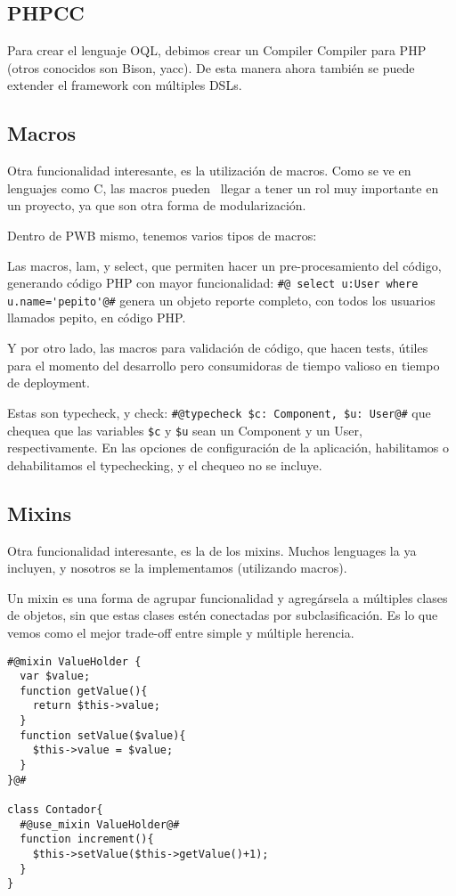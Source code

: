 \subsection{PHPCC}
Para crear el lenguaje OQL, debimos crear un Compiler Compiler para PHP (otros conocidos son Bison, yacc).
De esta manera ahora también se puede extender el framework con múltiples DSLs.

\subsection{Macros}
Otra funcionalidad interesante, es la utilización de macros. Como se ve en lenguajes como C, las macros pueden \
llegar a tener un rol muy importante en un proyecto, ya que son otra forma de modularización.

Dentro de PWB mismo, tenemos varios tipos de macros:

Las macros, lam, y select, que permiten hacer un pre-procesamiento del código, generando código PHP con
mayor funcionalidad:
\verb"#@ select u:User where u.name='pepito'@#"
genera un objeto reporte completo, con todos los usuarios llamados pepito, en código PHP.

Y por otro lado, las macros para validación de código, que hacen tests, útiles para el momento del desarrollo
pero consumidoras de tiempo valioso en tiempo de deployment.

Estas son typecheck, y check:
\verb"#@typecheck $c: Component, $u: User@#"
que chequea que las variables \verb"$c" y \verb"$u" sean un Component y un User, respectivamente. En las opciones de
configuración de la aplicación, habilitamos o dehabilitamos el typechecking, y el chequeo no se incluye.

\subsection{Mixins}

Otra funcionalidad interesante, es la de los mixins. Muchos lenguages la ya incluyen, y nosotros se la
implementamos (utilizando macros).

Un mixin es una forma de agrupar funcionalidad y agregársela a múltiples clases de objetos, sin que estas
clases estén conectadas por subclasificación. Es lo que vemos como el mejor trade-off entre simple y múltiple
herencia.
\begin{verbatim}
#@mixin ValueHolder {
  var $value;
  function getValue(){
    return $this->value;
  }
  function setValue($value){
    $this->value = $value;
  }
}@#

class Contador{
  #@use_mixin ValueHolder@#
  function increment(){
    $this->setValue($this->getValue()+1);
  }
}
\end{verbatim}
